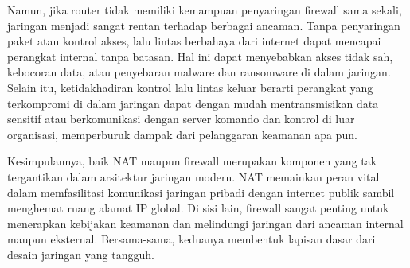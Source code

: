 Namun, jika router tidak memiliki kemampuan penyaringan firewall 
sama sekali, jaringan menjadi sangat rentan terhadap berbagai 
ancaman. Tanpa penyaringan paket atau kontrol akses, lalu lintas 
berbahaya dari internet dapat mencapai perangkat internal tanpa 
batasan. Hal ini dapat menyebabkan akses tidak sah, kebocoran 
data, atau penyebaran malware dan ransomware di dalam jaringan. 
Selain itu, ketidakhadiran kontrol lalu lintas keluar berarti 
perangkat yang terkompromi di dalam jaringan dapat dengan mudah 
mentransmisikan data sensitif atau berkomunikasi dengan server 
komando dan kontrol di luar organisasi, memperburuk dampak dari 
pelanggaran keamanan apa pun.

Kesimpulannya, baik NAT maupun firewall merupakan komponen yang 
tak tergantikan dalam arsitektur jaringan modern. NAT memainkan 
peran vital dalam memfasilitasi komunikasi jaringan pribadi 
dengan internet publik sambil menghemat ruang alamat IP global. 
Di sisi lain, firewall sangat penting untuk menerapkan kebijakan 
keamanan dan melindungi jaringan dari ancaman internal maupun 
eksternal. Bersama-sama, keduanya membentuk lapisan dasar dari 
desain jaringan yang tangguh.  

